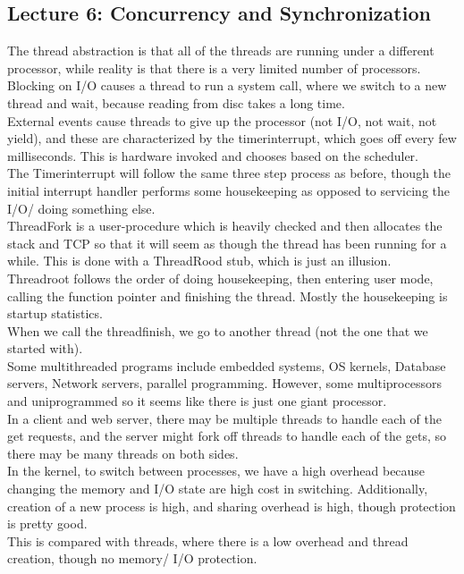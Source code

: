 \documentclass[paper=a4, fontsize=11pt]{scrartcl} %
\numberwithin{equation}{section} %
\numberwithin{figure}{section} %
\numberwithin{table}{section} %
\begin{document}
\subsection{Lecture 6: Concurrency and Synchronization}
The thread abstraction is that all of the threads are running under a different processor, while reality is that there is a very limited number of processors. \\
Blocking on I/O causes a thread to run a system call, where we switch to a new thread and wait, because reading from disc takes a long time.\\
External events cause threads to give up the processor (not I/O, not wait, not yield), and these are characterized by the timerinterrupt, which goes off every few milliseconds. This is hardware invoked and chooses based on the scheduler. \\
The Timerinterrupt will follow the same three step process as before, though the initial interrupt handler performs some housekeeping as opposed to servicing the I/O/ doing something else. \\
ThreadFork is a user-procedure which is heavily checked and then allocates the stack and TCP so that it will seem as though the thread has been running for a while. This is done with a ThreadRood stub, which is just an illusion.\\
Threadroot follows the order of doing housekeeping, then entering user mode, calling the function pointer and finishing the thread.  Mostly the housekeeping is startup statistics. \\
When we call the threadfinish, we go to another thread (not the one that we started with). \\
Some multithreaded programs include embedded systems, OS kernels, Database servers, Network servers, parallel programming. However, some multiprocessors and uniprogrammed so it seems like there is just one giant processor. \\
In a client and web server, there may be multiple threads to handle each of the get requests, and the server might fork off threads to handle each of the gets, so there may be many threads on both sides. \\
In the kernel, to switch between processes, we have a high overhead because changing the memory and I/O state are high cost in switching. Additionally, creation of a new process is high, and sharing overhead is high, though protection is pretty good.\\
This is compared with threads, where there is a low overhead and thread creation, though no memory/ I/O protection. \\
\end{document}
